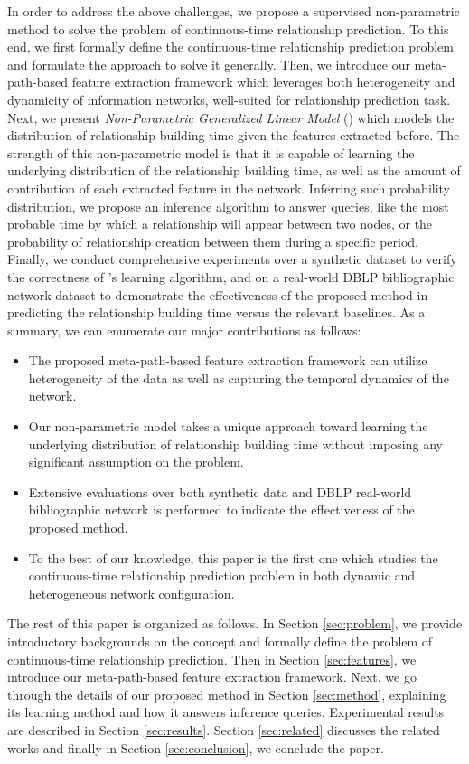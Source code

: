 In order to address the above challenges, we propose a supervised non-parametric method to solve the problem of continuous-time relationship prediction. To this end, we first formally define the continuous-time relationship prediction problem and formulate the approach to solve it generally. Then, we introduce our meta-path-based feature extraction framework which leverages both heterogeneity and dynamicity of information networks, well-suited for relationship prediction task. Next, we present \emph{Non-Parametric Generalized Linear Model} (\npglm) which models the distribution of relationship building time given the features extracted before. The strength of this non-parametric model is that it is capable of learning the underlying distribution of the relationship building time, as well as the amount of contribution of each extracted feature in the network. Inferring such probability distribution, we propose an inference algorithm to answer queries, like the most probable time by which a relationship will appear between two nodes, or the probability of relationship creation between them during a specific period. Finally, we conduct comprehensive experiments over a synthetic dataset to verify the correctness of \npglm's learning algorithm, and on a real-world DBLP bibliographic network dataset to demonstrate the effectiveness of the proposed method in predicting the relationship building time versus the relevant baselines. As a summary, we can enumerate our major contributions as follows:

\begin{itemize}
\item The proposed meta-path-based feature extraction framework can utilize heterogeneity of the data as well as capturing the temporal dynamics of the network.
\item Our non-parametric model takes a unique approach toward learning the underlying distribution of relationship building time without imposing any significant assumption on the problem.
\item Extensive evaluations over both synthetic data and DBLP real-world bibliographic network is performed to indicate the effectiveness of the proposed method. 
\item To the best of our knowledge, this paper is the first one which studies the continuous-time relationship prediction problem in both dynamic and heterogeneous network configuration.
\end{itemize}

The rest of this paper is organized as follows. In Section \ref{sec:problem}, we provide introductory backgrounds on the concept and formally define the problem of continuous-time relationship prediction. Then in Section \ref{sec:features}, we introduce our meta-path-based feature extraction framework. Next, we go through the details of our proposed \npglm method in Section \ref{sec:method}, explaining its learning method and how it answers inference queries. Experimental results are described in Section \ref{sec:results}. Section \ref{sec:related} discusses the related works and finally in Section \ref{sec:conclusion}, we conclude the paper.
